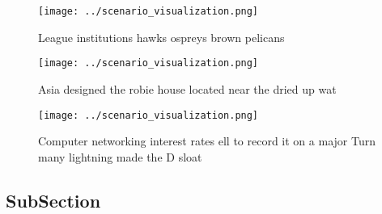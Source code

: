 \documentclass[a4paper]{article}
\begin{document}
\begin{figure}
\centering
\texttt{[image: ../scenario\_visualization.png]}
\caption{League institutions hawks ospreys brown pelicans 
}
\end{figure}
 
\begin{figure}
\centering
\texttt{[image: ../scenario\_visualization.png]}
\caption{Asia designed the robie house located near the dried up wat
}
\end{figure}
 
\begin{figure}
\centering
\texttt{[image: ../scenario\_visualization.png]}
\caption{Computer networking interest rates ell to record it on a major Turn many lightning made the D sloat
}
\end{figure}
 
\subsection{SubSection}
\end{document}
